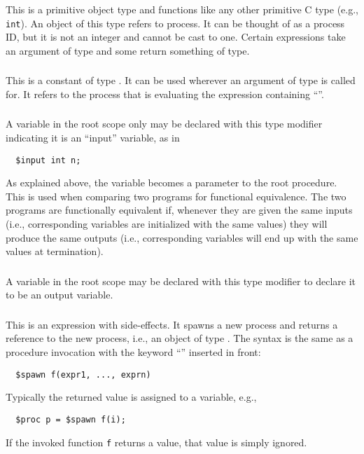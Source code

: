 \documentclass[11pt]{article}
\begin{document}
\subsubsection{\cproc} This is a primitive object type and functions
like any other primitive C type (e.g., \texttt{int}).  An object of
this type refers to process.  It can be thought of as a process ID,
but it is not an integer and cannot be cast to one.  Certain
expressions take an argument of \cproc{} type and some return
something of \cproc{} type.

\subsubsection{\cself} This is a constant of type \cproc.  It can be
used wherever an argument of type \cproc{} is called for.  It refers to
the process that is evaluating the expression containing ``\cself''.

\subsubsection{\cinput} A variable in the root scope only may be
declared with this type modifier indicating it is an ``input''
variable, as in
\begin{verbatim}
  $input int n;
\end{verbatim}
As explained above, the variable becomes a parameter to the root
procedure.  This is used when comparing two programs for functional
equivalence.  The two programs are functionally equivalent if,
whenever they are given the same inputs (i.e., corresponding \cinput{}
variables are initialized with the same values) they will produce the
same outputs (i.e., corresponding \coutput{} variables will end up
with the same values at termination).

\subsubsection{\coutput} A variable in the root scope may be
declared with this type modifier to declare it to be an output
variable.

\subsubsection{\cspawn} This is an expression with side-effects.  It
spawns a new process and returns a reference to the new process, i.e.,
an object of type \cproc.  The syntax is the same as a procedure
invocation with the keyword ``\cspawn'' inserted in front:
\begin{verbatim}
  $spawn f(expr1, ..., exprn)
\end{verbatim}
Typically the returned value is assigned to a variable, e.g.,
\begin{verbatim}
  $proc p = $spawn f(i);
\end{verbatim}
If the invoked function \texttt{f} returns a value, that value is
simply ignored.
\end{document}
